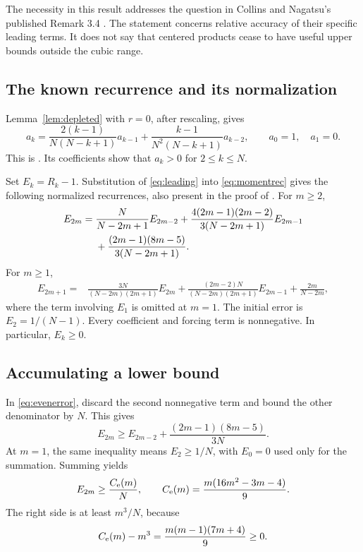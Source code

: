 \documentclass[11pt]{article}
\theoremstyle{definition}
\theoremstyle{remark}
\newcommand{\1}{\mathbf 1}
\begin{document}
The necessity in this result addresses the question in Collins and Nagatsu's published Remark 3.4 \cite{CN}. The statement concerns relative accuracy of their specific leading terms. It does not say that centered products cease to have useful upper bounds outside the cubic range.

\subsection{The known recurrence and its normalization}

Lemma~\ref{lem:depleted} with $r=0$, after rescaling, gives
\begin{equation}\label{eq:momentrec}
a_k=\frac{2(k-1)}{N(N-k+1)}a_{k-1}
+\frac{k-1}{N^2(N-k+1)}a_{k-2},
\qquad a_0=1,\quad a_1=0.
\end{equation}
This is \cite[equation (16)]{CN}. Its coefficients show that $a_k>0$ for $2\le k\le N$.

Set $E_k=R_k-1$. Substitution of \eqref{eq:leading} into \eqref{eq:momentrec} gives the following normalized recurrences, also present in the proof of \cite[Proposition 3.3]{CN}. For $m\ge2$,
\begin{align}
E_{2m}={}&\frac{N}{N-2m+1}E_{2m-2}
+\frac{4(2m-1)(2m-2)}{3(N-2m+1)}E_{2m-1}\notag\\
&+\frac{(2m-1)(8m-5)}{3(N-2m+1)}.\label{eq:evenerror}
\end{align}
For $m\ge1$,
\begin{align}
E_{2m+1}={}&\frac{3N}{(N-2m)(2m+1)}E_{2m}
+\frac{(2m-2)N}{(N-2m)(2m+1)}E_{2m-1}
+\frac{2m}{N-2m},\label{eq:odderror}
\end{align}
where the term involving $E_1$ is omitted at $m=1$. The initial error is $E_2=1/(N-1)$. Every coefficient and forcing term is nonnegative. In particular, $E_k\ge0$.

\subsection{Accumulating a lower bound}

In \eqref{eq:evenerror}, discard the second nonnegative term and bound the other denominator by $N$. This gives
\[
E_{2m}\ge E_{2m-2}+\frac{(2m-1)(8m-5)}{3N}.
\]
At $m=1$, the same inequality means $E_2\ge1/N$, with $E_0=0$ used only for the summation. Summing yields
\begin{equation}\label{eq:evenlower}
E_{2m}\ge\frac{C_{\rm e}(m)}N,
\qquad C_{\rm e}(m)=\frac{m(16m^2-3m-4)}9.
\end{equation}
The right side is at least $m^3/N$, because
\[
C_{\rm e}(m)-m^3=\frac{m(m-1)(7m+4)}9\ge0.
\]
\end{document}

